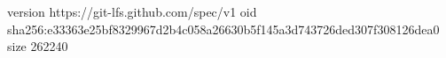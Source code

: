 version https://git-lfs.github.com/spec/v1
oid sha256:e33363e25bf8329967d2b4c058a26630b5f145a3d743726ded307f308126dea0
size 262240

